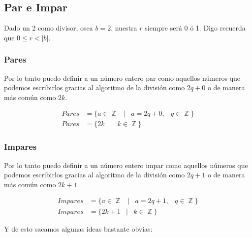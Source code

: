 \documentclass[12pt]{report}                                    %
\DeclareMathOperator \Space {\quad}                             %
\DeclareMathOperator \MiniSpace {\;}                            %
\newcommand \Such {\MiniSpace|\MiniSpace}                       %
\DeclareMathOperator \Integers  {\mathbb{Z}}                     %
\begin{document}
        \clearpage
        \subsection{Par e Impar}

            Dado un 2 como divisor, osea $b=2$, nuestra $r$ siempre será 0 ó 1.
            Digo recuerda que $0\leq r < |b|$.

            \subsubsection{Pares}
                Por lo tanto puedo definir a un número entero par como aquellos números
                que podemos escribirlos gracias al algoritmo de la división como
                $2q+0$ o de manera más común como $2k$.

                \begin{equation}
                \begin{split}
                    Pares &= \{a \in \Integers \Such a = 2q + 0, \MiniSpace q \in \Integers \}\\
                    Pares &= \{2k \Such k \in \Integers\}
                \end{split}
                \end{equation}

            \subsubsection{Impares}
                Por lo tanto puedo definir a un número entero impar como aquellos números
                que podemos escribirlos gracias al algoritmo de la división como
                $2q+1$ o de manera más común como $2k+1$.

                \begin{equation}
                \begin{split}
                    Impares &= \{a \in \Integers \Such a = 2q + 1, \MiniSpace q \in \Integers \}\\
                    Impares &= \{2k+1 \Such k \in \Integers\}
                \end{split}
                \end{equation}


            Y de esto sacamos algunas ideas bastante obvias:
\end{document}
